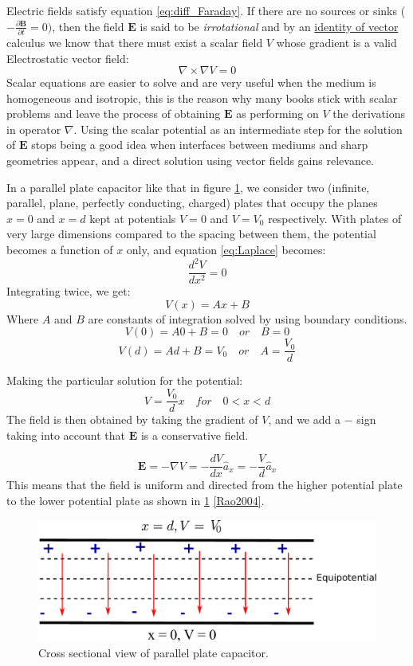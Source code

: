 Electric fields satisfy equation \ref{eq:diff_Faraday}. If there are no sources or sinks ($- \frac{\partial \mathbf{B}}{\partial t}=0)$, then the field $\mathbf{E}$ is said to be \textit{irrotational} and by an \href{http://ebooksgo.org/mathematics/Vector_Identity.pdf}{identity of vector} calculus we know that there must exist a scalar field $V$ whose gradient is a valid Electrostatic vector field:
\begin{equation}
\nabla\times\nabla V = 0
\label{eq:Laplace}
\end{equation}
Scalar equations are easier to solve and are very useful when the medium is homogeneous and isotropic, this is the reason why many books stick with scalar problems and leave the process of obtaining $\mathbf{E}$ as performing on $V$ the derivations in operator $\nabla$. Using the scalar potential as an intermediate step for the solution of $\mathbf{E}$ stops being a good idea when interfaces between mediums and sharp geometries appear, and a direct solution using vector fields gains relevance.

In a parallel plate capacitor like that in figure \ref{fig:parallel_plate}, we consider two (infinite, parallel, plane, perfectly conducting, charged) plates that occupy the planes $x = 0$ and $x = d$ kept at potentials $V = 0$ and $V = V_0$ respectively.  
With plates of very large dimensions compared to the spacing between them, the potential becomes a function of $x$ only, and equation \ref{eq:Laplace} becomes:
$$\dfrac{d^2V}{d x^2}=0$$ Integrating twice, we get: 
\begin{equation}
V(x) = Ax + B
\end{equation}
Where $A$  and $B$ are constants of integration solved by using boundary conditions.
$$V(0) = A0 + B = 0 \quad or \quad B = 0$$$$V(d) = Ad + B = V_0 \quad or \quad A = \dfrac{V_0}{d}$$

Making the particular solution for the potential:
$$V=\dfrac{V_0}{d}x \quad for \quad 0<x<d$$ 
The field is then obtained by taking the gradient of $V$, and we add a $-$ sign taking into account that $\mathbf{E}$ is a conservative field.

\begin{equation}
\mathbf{E}= -\nabla V = - \dfrac{dV}{dx}\hat{a}_x = -\dfrac{V}{d}\hat{a}_x
\end{equation}
 This means that the field is uniform and directed from the higher potential plate to the lower potential plate as shown in \ref{fig:parallel_plate} \ref{Rao2004}.

\begin{figure}
\centering
\includegraphics[scale=0.5]{./img/parallel_plate_capacitor.pdf}
\caption{Cross sectional view of parallel plate capacitor.}
\label{fig:parallel_plate}
\end{figure}

